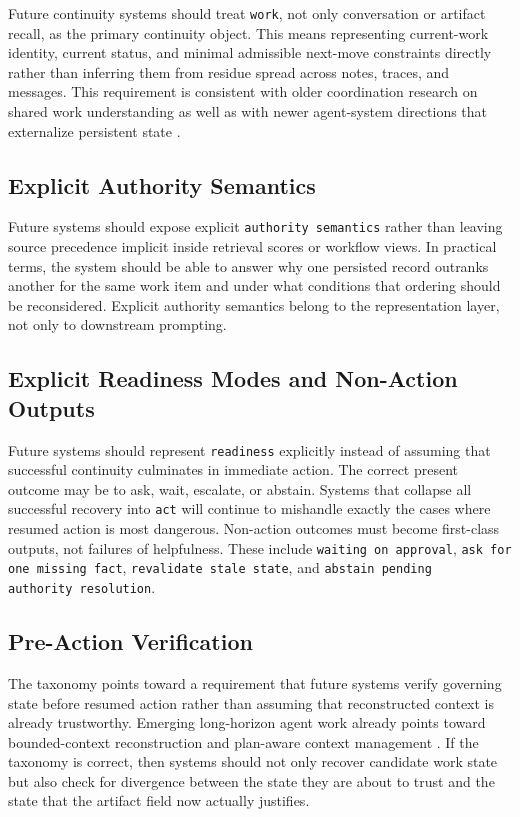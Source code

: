 \documentclass[a4paper,fleqn]{cas-dc}
\begin{document}
Future continuity systems should treat \texttt{work}, not only conversation or artifact recall, as the primary continuity object. This means representing current-work identity, current status, and minimal admissible next-move constraints directly rather than inferring them from residue spread across notes, traces, and messages. This requirement is consistent with older coordination research on shared work understanding as well as with newer agent-system directions that externalize persistent state \cite{Espinosa2001,Dewan2007,Ryan2013,Marron2024,Yu2026}.

\subsection{Explicit Authority Semantics}

Future systems should expose explicit \texttt{authority semantics} rather than leaving source precedence implicit inside retrieval scores or workflow views. In practical terms, the system should be able to answer why one persisted record outranks another for the same work item and under what conditions that ordering should be reconsidered. Explicit authority semantics belong to the representation layer, not only to downstream prompting.

\subsection{Explicit Readiness Modes and Non-Action Outputs}

Future systems should represent \texttt{readiness} explicitly instead of assuming that successful continuity culminates in immediate action. The correct present outcome may be to ask, wait, escalate, or abstain. Systems that collapse all successful recovery into \texttt{act} will continue to mishandle exactly the cases where resumed action is most dangerous. Non-action outcomes must become first-class outputs, not failures of helpfulness. These include \texttt{waiting on approval}, \texttt{ask for one missing fact}, \texttt{revalidate stale state}, and \texttt{abstain pending authority\allowbreak\ resolution}.

\subsection{Pre-Action Verification}

The taxonomy points toward a requirement that future systems verify governing state before resumed action rather than assuming that reconstructed context is already trustworthy. Emerging long-horizon agent work already points toward bounded-context reconstruction and plan-aware context management \cite{Yuksel2025,Yu2026}. If the taxonomy is correct, then systems should not only recover candidate work state but also check for divergence between the state they are about to trust and the state that the artifact field now actually justifies.
\end{document}
